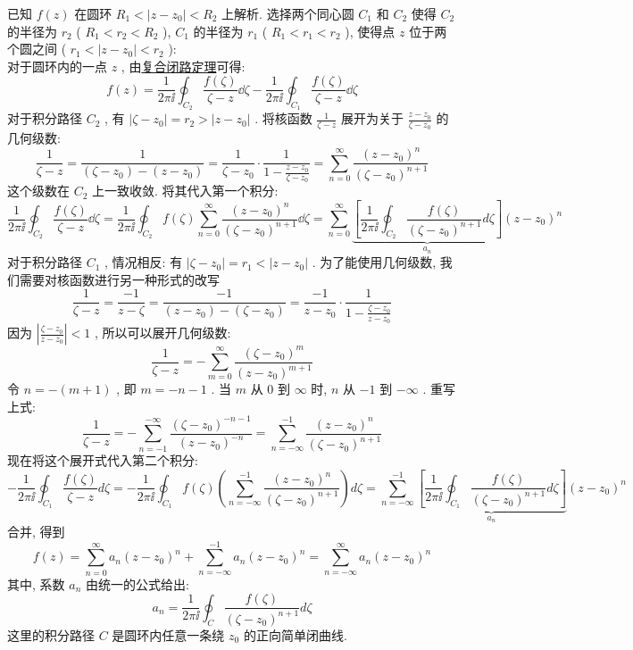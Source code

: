 \documentclass[UTF8]{ctexart}
\begin{document}
\begin{prf}
    已知  \( f(z) \)  在圆环  \( R_1 < |z - z_0| < R_2 \)  上解析. 选择两个同心圆  \( C_1 \)  和  \( C_2 \)  使得  \( C_2 \)  的半径为  \( r_2 \)  ( \( R_1 < r_2 < R_2 \) ),  \( C_1 \)  的半径为  \( r_1 \)  ( \( R_1 < r_1 < r_2 \) ), 使得点  \( z \)  位于两个圆之间 ( \( r_1 < |z - z_0| < r_2 \) ):\\
    对于圆环内的一点  \( z \) , 由\hyperref[thm:CombinedClosedCircuit]{复合闭路定理}可得: 
    \[f(z) = \frac{1}{2\pi\ii} \oint_{C_2} \frac{f(\zeta)}{\zeta - z} \dd\zeta - \frac{1}{2\pi\ii} \oint_{C_1} \frac{f(\zeta)}{\zeta - z}  \dd\zeta\]
    对于积分路径  \( C_2 \) , 有  \( |\zeta - z_0| = r_2 > |z - z_0| \) . 将核函数  \( \frac{1}{\zeta - z} \)  展开为关于  \( \frac{z-z_0}{\zeta-z_0} \)  的几何级数: 
    \[\frac{1}{\zeta - z} = \frac{1}{(\zeta - z_0) - (z - z_0)} = \frac{1}{\zeta - z_0} \cdot \frac{1}{1 - \frac{z-z_0}{\zeta-z_0}} = \sum_{n=0}^{\infty} \frac{(z - z_0)^n}{(\zeta - z_0)^{n+1}}\]
    这个级数在  \( C_2 \)  上一致收敛. 将其代入第一个积分: 
    \[\frac{1}{2\pi\ii} \oint_{C_2} \frac{f(\zeta)}{\zeta - z} \dd\zeta = \frac{1}{2\pi\ii} \oint_{C_2} f(\zeta) \sum_{n=0}^{\infty} \frac{(z - z_0)^n}{(\zeta - z_0)^{n+1}} \dd\zeta = \sum_{n=0}^{\infty} \underbrace{\left[ \frac{1}{2\pi\ii} \oint_{C_2} \frac{f(\zeta)}{(\zeta - z_0)^{n+1}} d\zeta \right]}_{a_n} (z - z_0)^n\]
    对于积分路径  \( C_1 \) , 情况相反: 有  \( |\zeta - z_0| = r_1 < |z - z_0| \) . 为了能使用几何级数, 我们需要对核函数进行另一种形式的改写
    \[\frac{1}{\zeta - z} = \frac{-1}{z - \zeta} = \frac{-1}{(z - z_0) - (\zeta - z_0)} = \frac{-1}{z - z_0} \cdot \frac{1}{1 - \frac{\zeta-z_0}{z-z_0}}\]
    因为  \( \left| \frac{\zeta-z_0}{z-z_0} \right| < 1 \) , 所以可以展开几何级数: 
    \[\frac{1}{\zeta - z} = -\sum_{m=0}^{\infty} \frac{(\zeta - z_0)^m}{(z - z_0)^{m+1}}\]
    令  \( n = -(m+1) \) , 即  \( m = -n - 1 \) . 当  \( m \)  从  \( 0 \)  到  \( \infty \)  时,  \( n \)  从  \( -1 \)  到  \( -\infty \) . 重写上式: 
    \[\frac{1}{\zeta - z} = -\sum_{n=-1}^{-\infty} \frac{(\zeta - z_0)^{-n-1}}{(z - z_0)^{-n}} = \sum_{n=-\infty}^{-1} \frac{(z - z_0)^n}{(\zeta - z_0)^{n+1}}\]
    现在将这个展开式代入第二个积分: 
    \[-\frac{1}{2\pi\ii} \oint_{C_1} \frac{f(\zeta)}{\zeta - z}  d\zeta = -\frac{1}{2\pi\ii} \oint_{C_1} f(\zeta) \left( \sum_{n=-\infty}^{-1} \frac{(z - z_0)^n}{(\zeta - z_0)^{n+1}} \right) d\zeta = \sum_{n=-\infty}^{-1} \underbrace{\left[ \frac{1}{2\pi\ii} \oint_{C_1} \frac{f(\zeta)}{(\zeta - z_0)^{n+1}} d\zeta \right]}_{a_n} (z - z_0)^n\]
    合并, 得到
    \[f(z) = \sum_{n=0}^{\infty} a_n (z - z_0)^n + \sum_{n=-\infty}^{-1} a_n (z - z_0)^n = \sum_{n=-\infty}^{\infty} a_n (z - z_0)^n\]
    其中, 系数  \( a_n \)  由统一的公式给出: 
    \[a_n = \frac{1}{2\pi\ii} \oint_C \frac{f(\zeta)}{(\zeta - z_0)^{n+1}}  d\zeta\]
    这里的积分路径  \( C \)  是圆环内任意一条绕  \( z_0 \)  的正向简单闭曲线. 
\end{prf}
\end{document}

